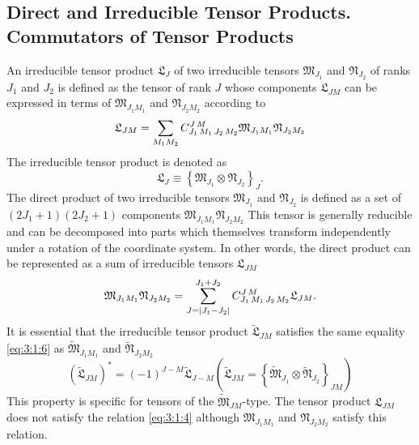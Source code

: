 \subsection{Direct and Irreducible Tensor Products. Commutators of Tensor Products}\label{sec:3.1.7}
An irreducible tensor product $\mathfrak{L}_{J}$ of two irreducible tensors $\mathfrak{M}_{J_{1}}$ and $\mathfrak{N}_{J_{2}}$ of ranks $J_{1}$ and $J_{2}$ is defined as the tensor of rank $J$ whose components $\mathfrak{L}_{J M}$ can be expressed in terms of $\mathfrak{M}_{J_{1} M_{1}}$ and $\mathfrak{N}_{J_{2} M_{2}}$ according to
\begin{equation}
\mathfrak{L}_{J M}=\sum_{M_{1} M_{2}} C_{J_{1}\,M_{1}\,J_{2}\,M_{2}}^{J\,M} \mathfrak{M}_{J_{1} M_{1}} \mathfrak{N}_{J_{2} M_{2}} \label{eq:3:1:20}
\end{equation}
The irreducible tensor product is denoted as
\begin{equation}
\mathfrak{L}_{J} \equiv\left\{\mathfrak{M}_{J_{1}} \otimes \mathfrak{N}_{J_{2}}\right\}_{J} . \label{eq:3:1:21}
\end{equation}
The direct product of two irreducible tensors $\mathfrak{M}_{J_{1}}$ and $\mathfrak{N}_{J_{2}}$ is defined as a set of $\left(2 J_{1}+1\right)\left(2 J_{2}+1\right)$ components $\mathfrak{M}_{J_{1} M_{1}} \mathfrak{N}_{J_{2} M_{2}}$ This tensor is generally reducible and can be decomposed into parts which themselves transform independently under a rotation of the coordinate system. In other words, the direct product can be represented as a sum of irreducible tensors $\mathfrak{L}_{J M}$
\begin{equation}
\mathfrak{M}_{J_{1} M_{1}} \mathfrak{N}_{J_{2} M_{2}}=\sum_{J=\left|J_{1}-J_{2}\right|}^{J_{1}+J_{2}} C_{J_{1}\,M_{1}\,J_{2}\,M_{2}}^{J\,M} \mathfrak{L}_{J M} .\label{eq:3:1:22}
\end{equation}
It is essential that the irreducible tensor product $\widetilde{\mathfrak{L}}_{J M}$ satisfies the same equality \eqref{eq:3:1:6} as $\widetilde{\mathfrak{M}}_{J_{1} M_{1}}$ and $\widetilde{\mathfrak{N}}_{J_{2} M_{2}}$
\begin{equation}
\left(\widetilde{\mathfrak{L}}_{J M}\right)^{*}=(-1)^{J-M} \widetilde{\mathfrak{L}}_{J-M}\left(\widetilde{\mathfrak{L}}_{J M}=\left\{\widetilde{\mathfrak{M}}_{J_{1}} \otimes \widetilde{\mathfrak{N}}_{J_{2}}\right\}_{J M}\right) \label{eq:3:1:23}
\end{equation}
This property is specific for tensors of the $\widetilde{\mathfrak{M}}_{J M}$-type. The tensor product $\mathfrak{L}_{J M}$ does not satisfy the relation \eqref{eq:3:1:4} although $\mathfrak{M}_{J_{1} M_{1}}$ and $\mathfrak{N}_{J_{2} M_{2}}$ satisfy this relation.

